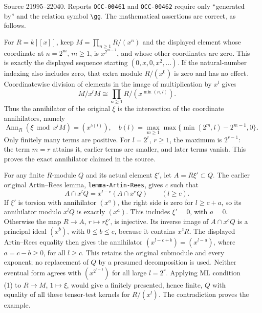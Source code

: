 Source 21995--22040. Reports \texttt{OCC-00461} and \texttt{OCC-00462} require only ``generated by'' and the relation symbol \texttt{\textbackslash{}gg}. The mathematical assertions are correct, as follows.

For \(R=k[[x]]\), keep \(M=\prod_{n\geq1}R/(x^n)\) and the displayed element whose coordinate at \(n=2^m\), \(m\geq1\), is \(x^{2^{m-1}}\), and whose other coordinates are zero. This is exactly the displayed sequence starting \((0,x,0,x^2,\ldots)\). If the natural-number indexing also includes zero, that extra module \(R/(x^0)\) is zero and has no effect. Coordinatewise division of elements in the image of multiplication by \(x^l\) gives \[
M/x^lM\cong\prod_{n\geq1}R/(x^{\min(n,l)}).
\] Thus the annihilator of the original \(\xi\) is the intersection of the coordinate annihilators, namely \[
\operatorname{Ann}_R(\xi\bmod x^lM)=(x^{b(l)}),
\quad b(l)=\max_{m\geq1}\max\{\min(2^m,l)-2^{m-1},0\}.
\] Only finitely many terms are positive. For \(l=2^r\), \(r\geq1\), the maximum is \(2^{r-1}\): the term \(m=r\) attains it, earlier terms are smaller, and later terms vanish. This proves the exact annihilator claimed in the source.

For any finite \(R\)-module \(Q\) and its actual element \(\xi'\), let \(A=R\xi'\subset Q\). The earlier original Artin--Rees lemma, \texttt{lemma-\AlgebraIdentifierBreak{}Artin-\AlgebraIdentifierBreak{}Rees}, gives \(c\) such that \[
A\cap x^lQ=x^{l-c}(A\cap x^cQ)\qquad(l\geq c).
\] If \(\xi'\) is torsion with annihilator \((x^a)\), the right side is zero for \(l\geq c+a\), so its annihilator modulo \(x^lQ\) is exactly \((x^a)\). This includes \(\xi'=0\), with \(a=0\). Otherwise the map \(R\to A\), \(r\mapsto r\xi'\), is injective. Its inverse image of \(A\cap x^cQ\) is a principal ideal \((x^b)\), with \(0\leq b\leq c\), because it contains \(x^cR\). The displayed Artin--Rees equality then gives the annihilator \((x^{l-c+b})=(x^{l-a})\), where \(a=c-b\geq0\), for all \(l\geq c\). This retains the original submodule and every exponent; no replacement of \(Q\) by a presumed decomposition is used. Neither eventual form agrees with \((x^{2^{r-1}})\) for all large \(l=2^r\). Applying ML condition (1) to \(R\to M\), \(1\mapsto\xi\), would give a finitely presented, hence finite, \(Q\) with equality of all these tensor-test kernels for \(R/(x^l)\). The contradiction proves the example.

